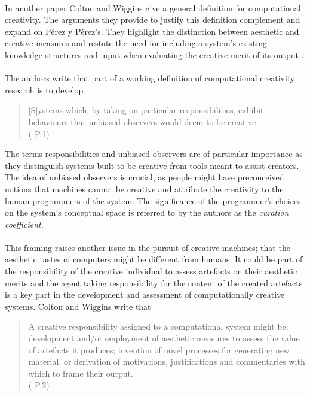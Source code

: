 \documentclass[letterpaper]{article}
\begin{document}
\\In another paper Colton and Wiggins give a general definition for computational creativity. The arguments they provide to justify this definition complement and expand on P\'erez y P\'erez's. They highlight the distinction between aesthetic and creative measures and restate the need for including a system's existing knowledge structures and input when evaluating the creative merit of its output .\\
\\The authors write that part of a working definition of computational creativity research is to develop
\begin{quote}
[S]ystems which, by taking on particular responsibilities, exhibit behaviours that unbiased observers would deem to be creative.\\
( P.1)
\end{quote}
The terms responsibilities and unbiased observers are of particular importance as they distinguish systems built to be creative from tools meant to assist creators. The idea of unbiased observers is crucial, as people might have preconceived notions that machines cannot be creative and attribute the creativity to the human programmers of the system. The significance of the programmer's choices on the system's conceptual space is referred to by the authors as the \emph{curation coefficient}.\\
\\This framing raises another issue in the pursuit of creative machines; that the aesthetic tastes of computers might be different from humans. It could be part of the responsibility of the creative individual to assess artefacts on their aesthetic merits and the agent taking responsibility for the content of the created artefacts is a key part in the development and assessment of computationally creative systems. Colton and Wiggins write that
\begin{quote}
A creative responsibility assigned to a computational system might be: development and/or employment of aesthetic measures to assess the value of artefacts it produces; invention of novel processes for generating new material; or derivation of motivations, justifications and commentaries with which to frame their output.\\ %
( P.2)
\end{quote}
\end{document}
